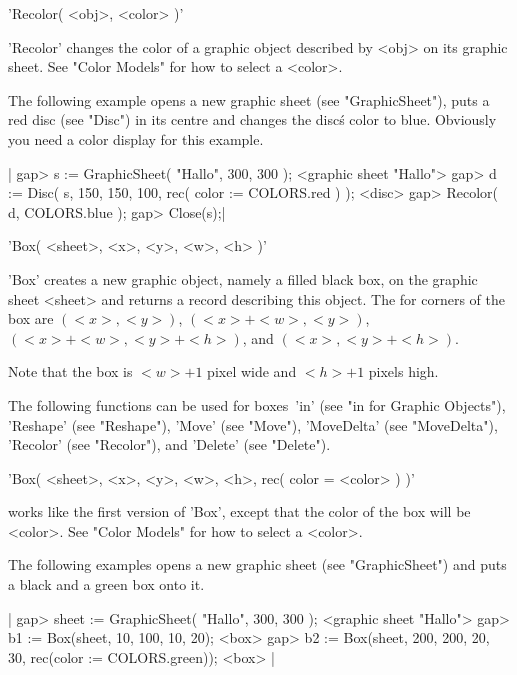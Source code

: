 
'Recolor( <obj>, <color> )'

'Recolor' changes the color of a graphic object described by <obj> on its
graphic sheet.  See "Color Models" for how to select a <color>.

The following example  opens  a new  graphic sheet (see  "GraphicSheet"),
puts a red disc (see "Disc") in its centre and  changes the disc\'s color
to blue.  Obviously you need a color display for this example.

|    gap> s := GraphicSheet(  "Hallo", 300, 300 );
    <graphic sheet "Hallo">
    gap> d := Disc( s, 150, 150, 100, rec( color := COLORS.red ) );
    <disc>
    gap> Recolor( d, COLORS.blue );
    gap> Close(s);|


'Box( <sheet>, <x>, <y>, <w>, <h> )'

'Box' creates a  new graphic object, namely  a filled  black box, on  the
graphic sheet <sheet> and returns a {\GAP} record describing this object.
The  for   corners   of  the   box    are  $(<x>,<y>)$,  $(<x>+<w>,<y>)$,
$(<x>+<w>,<y>+<h>)$, and $(<x>,<y>+<h>)$.

Note that the box is $<w>+1$ pixel wide and $<h>+1$ pixels high.

The following functions   can be  used  for  boxes\:\ 'in'  (see "in  for
Graphic   Objects"), 'Reshape'   (see  "Reshape"),  'Move'  (see "Move"),
'MoveDelta' (see   "MoveDelta"), 'Recolor' (see "Recolor"),  and 'Delete'
(see "Delete").

'Box( <sheet>, <x>, <y>, <w>, <h>, rec( color \:= <color> ) )'

works like the first version of 'Box',  except that the  color of the box
will be <color>.  See "Color Models" for how to select a <color>.

The following examples opens a new graphic sheet (see "GraphicSheet") and
puts a black and a green box onto it.

|    gap> sheet := GraphicSheet(  "Hallo", 300, 300 );
    <graphic sheet "Hallo">
    gap> b1 := Box(sheet, 10, 100, 10, 20);
    <box>
    gap> b2 := Box(sheet, 200, 200, 20, 30, rec(color := COLORS.green));
    <box> |


